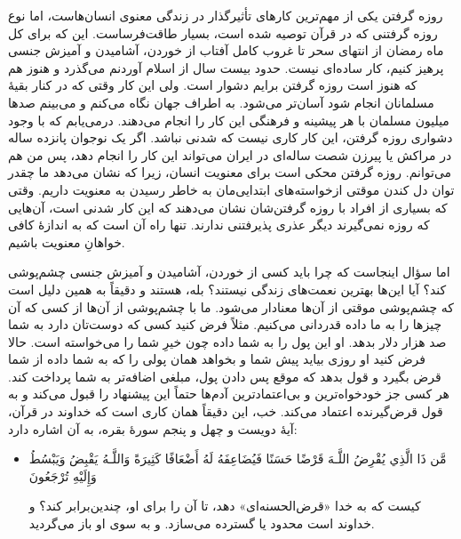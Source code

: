 روزه گرفتن یکی از مهم‌ترین کارهای تأثیرگذار در زندگی معنوی انسان‌هاست، اما نوع روزه گرفتنی که در قرآن توصیه شده است، بسیار طاقت‌فرساست. این که برای کل ماه رمضان از انتهای سحر تا غروب کامل آفتاب از خوردن، آشامیدن و آمیزش جنسی پرهیز کنیم، کار ساده‌ای نیست. حدود بیست سال از اسلام آوردنم می‌گذرد و هنوز هم که هنوز است روزه گرفتن برایم دشوار است. ولی این کار وقتی که در کنار بقیهٔ مسلمانان انجام شود آسان‌تر ‌‌می‌شود. به اطراف جهان نگاه ‌می‌کنم و ‌‌می‌بینم صدها میلیون مسلمان با هر پیشینه و فرهنگی این کار را انجام می‌دهند. درمی‌یابم که  با وجود دشواری روزه گرفتن،  این کار کاری نیست که شدنی نباشد. اگر یک نوجوان پانزده ساله در مراکش یا پیرزن شصت ساله‌ای در ایران می‌تواند این کار را انجام دهد، پس من هم می‌توانم. روزه گرفتن محکی است برای معنویت انسان، زیرا که نشان می‌دهد  ما چقدر توان  دل کندن موقتی  ازخواسته‌های ابتدایی‌مان به خاطر رسیدن به معنویت داریم. وقتی که بسیاری از افراد با روزه گرفتن‌شان نشان می‌دهند که این کار شدنی است، آن‌هایی که روزه نمی‌گیرند دیگر عذری پذیرفتنی ندارند. تنها راه آن است که به اندازهٔ کافی خواهانِ معنویت باشیم.


اما سؤال اینجاست که چرا باید کسی از خوردن، آشامیدن و آمیزش جنسی چشم‌پوشی کند؟ آیا این‌ها بهترین نعمت‌های زندگی نیستند؟ بله، هستند و دقیقاً به همین دلیل است که چشم‌پوشی موقتی از آن‌ها معنادار می‌شود. ما با چشم‌پوشی از آن‌ها از کسی که آن چیزها را به ما داده قدردانی می‌کنیم. مثلاً فرض کنید کسی که دوست‌تان دارد به شما صد هزار دلار بدهد. او این پول را به شما داده چون خیرِ شما را می‌خواسته است. حالا فرض کنید او روزی بیاید پیش شما و بخواهد همان پولی را که به شما داده از شما قرض بگیرد و قول بدهد که موقع پس دادن پول، مبلغی اضافه‌تر به شما پرداخت کند. هر کسی جز خودخواه‌ترین و بی‌اعتمادترین آدم‌ها حتماً این پیشنهاد را قبول می‌کند و به قول قرض‌گیرنده اعتماد می‌کند. خب، این دقیقاً همان کاری است که خداوند در قرآن، آیهٔ دویست و چهل و پنجم سورهٔ بقره، به آن اشاره دارد:

\begin{itemize}
	\item[]
	{
		مَّن ذَا الَّذِي يُقْرِضُ اللَّـهَ قَرْضًا حَسَنًا فَيُضَاعِفَهُ لَهُ أَضْعَافًا كَثِيرَةً  وَاللَّـهُ يَقْبِضُ وَيَبْسُطُ وَإِلَيْهِ تُرْجَعُونَ}
	
	{
		کیست که به خدا «قرض‌الحسنه‌ای» دهد،  تا آن را برای او، چندین‌برابر کند؟ و خداوند است محدود یا گسترده می‌سازد. و به سوی او باز می‌گردید.}
\end{itemize}

